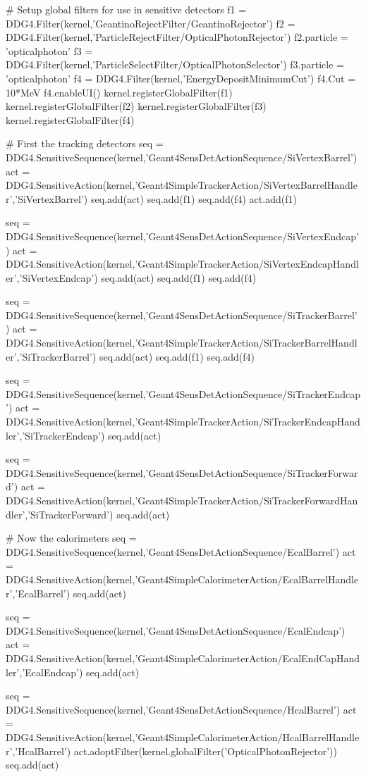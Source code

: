 \documentclass[10pt,a4paper]{article}
\begin{document}
\begin{code}
  # Setup global filters for use in sensitive detectors
  f1 = DDG4.Filter(kernel,'GeantinoRejectFilter/GeantinoRejector')
  f2 = DDG4.Filter(kernel,'ParticleRejectFilter/OpticalPhotonRejector')
  f2.particle = 'opticalphoton'
  f3 = DDG4.Filter(kernel,'ParticleSelectFilter/OpticalPhotonSelector') 
  f3.particle = 'opticalphoton'
  f4 = DDG4.Filter(kernel,'EnergyDepositMinimumCut')
  f4.Cut = 10*MeV
  f4.enableUI()
  kernel.registerGlobalFilter(f1)
  kernel.registerGlobalFilter(f2)
  kernel.registerGlobalFilter(f3)
  kernel.registerGlobalFilter(f4)

  # First the tracking detectors
  seq = DDG4.SensitiveSequence(kernel,'Geant4SensDetActionSequence/SiVertexBarrel')
  act = DDG4.SensitiveAction(kernel,'Geant4SimpleTrackerAction/SiVertexBarrelHandler','SiVertexBarrel')
  seq.add(act)
  seq.add(f1)
  seq.add(f4)
  act.add(f1)

  seq = DDG4.SensitiveSequence(kernel,'Geant4SensDetActionSequence/SiVertexEndcap')
  act = DDG4.SensitiveAction(kernel,'Geant4SimpleTrackerAction/SiVertexEndcapHandler','SiVertexEndcap')
  seq.add(act)
  seq.add(f1)
  seq.add(f4)

  seq = DDG4.SensitiveSequence(kernel,'Geant4SensDetActionSequence/SiTrackerBarrel')
  act = DDG4.SensitiveAction(kernel,'Geant4SimpleTrackerAction/SiTrackerBarrelHandler','SiTrackerBarrel')
  seq.add(act)
  seq.add(f1)
  seq.add(f4)

  seq = DDG4.SensitiveSequence(kernel,'Geant4SensDetActionSequence/SiTrackerEndcap')
  act = DDG4.SensitiveAction(kernel,'Geant4SimpleTrackerAction/SiTrackerEndcapHandler','SiTrackerEndcap')
  seq.add(act)

  seq = DDG4.SensitiveSequence(kernel,'Geant4SensDetActionSequence/SiTrackerForward')
  act = DDG4.SensitiveAction(kernel,'Geant4SimpleTrackerAction/SiTrackerForwardHandler','SiTrackerForward')
  seq.add(act)

  # Now the calorimeters
  seq = DDG4.SensitiveSequence(kernel,'Geant4SensDetActionSequence/EcalBarrel')
  act = DDG4.SensitiveAction(kernel,'Geant4SimpleCalorimeterAction/EcalBarrelHandler','EcalBarrel')
  seq.add(act)

  seq = DDG4.SensitiveSequence(kernel,'Geant4SensDetActionSequence/EcalEndcap')
  act = DDG4.SensitiveAction(kernel,'Geant4SimpleCalorimeterAction/EcalEndCapHandler','EcalEndcap')
  seq.add(act)

  seq = DDG4.SensitiveSequence(kernel,'Geant4SensDetActionSequence/HcalBarrel')
  act = DDG4.SensitiveAction(kernel,'Geant4SimpleCalorimeterAction/HcalBarrelHandler','HcalBarrel')
  act.adoptFilter(kernel.globalFilter('OpticalPhotonRejector'))
  seq.add(act)


\end{code}
\end{document}

